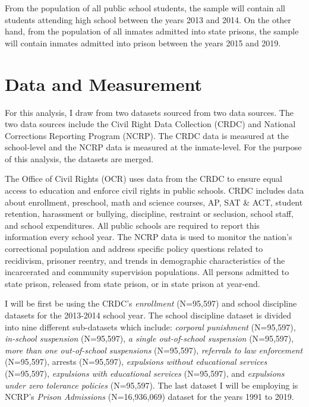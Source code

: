 \documentclass[12pt]{article}
\begin{document}
From the population of all public school students, the sample will contain all students attending high school between the years 2013 and 2014. On the other hand, from the population of all inmates admitted into state prisons, the sample will contain inmates admitted into prison between the years 2015 and 2019. 



\section*{Data and Measurement}
For this analysis, I draw from two datasets sourced from two data sources. The two data sources include the Civil Right Data Collection (CRDC) and National Corrections Reporting Program (NCRP). The CRDC data is measured at the school-level and the NCRP data is measured at the inmate-level. For the purpose of this analysis, the datasets are merged. 

The Office of Civil Rights (OCR) uses data from the CRDC to ensure equal access to education and enforce civil rights in public schools. CRDC includes data about enrollment, preschool, math and science courses, AP, SAT \& ACT, student retention, harassment or bullying, discipline, restraint or seclusion, school staff, and school expenditures. All public schools are required to report this information every school year. The NCRP data is used to monitor the nation's correctional population and address specific policy questions related to recidivism, prisoner reentry, and trends in demographic characteristics of the incarcerated and community supervision populations. All persons admitted to state prison, released from state prison, or in state prison at year-end. 

I will be first be using the CRDC's \emph{enrollment} (N=95,597) and school discipline datasets for the 2013-2014 school year. The school discipline dataset is divided into nine different sub-datasets which include: \emph{corporal punishment} (N=95,597), \emph{in-school suspension} (N=95,597), \emph{a single out-of-school suspension} (N=95,597), \emph{more than one out-of-school suspensions} (N=95,597), \emph{referrals to law enforcement} (N=95,597), arrests (N=95,597), \emph{expulsions without educational services} (N=95,597), \emph{expulsions with educational services} (N=95,597), and \emph{expulsions under zero tolerance policies} (N=95,597). The last dataset I will be employing is NCRP's \emph{Prison Admissions} (N=16,936,069) dataset for the years 1991 to 2019.   
\end{document}
